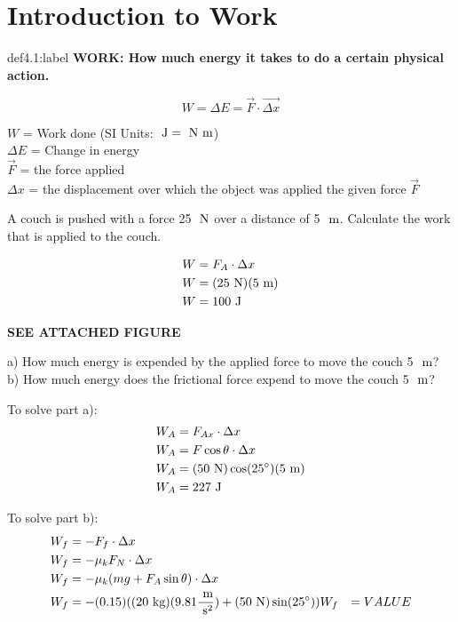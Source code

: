 \section{Introduction to Work}

\begin{definition}{def4.1:label}
    \textbf{WORK: How much energy it takes to do a certain physical action.}

    $$
    W = \Delta E = \vec F \cdot \vec {\Delta x}
    $$

    $W$ = Work done (SI Units: $\text{ J} = \text{ N}\text{ m}$)\\
    $\Delta E$ = Change in energy\\
    $\vec F$ = the force applied\\
    $\Delta x$ = the displacement over which the object was applied the given force $\vec F$
\end{definition}


\begin{problem}
    A couch is pushed with a force 25 $\text{ N}$ over a distance of 5 $\text{ m}$. Calculate the work that is applied to the couch. 

    $$
    \begin{aligned}
        W &= F_A \cdot \Delta x\\
        W &= (25 \text{ N})(5 \text{ m})\\
        W &= 100 \text{ J}
    \end{aligned}
    $$
\end{problem}


\begin{problem}
    \textbf{SEE ATTACHED FIGURE}

    a) How much energy is expended by the applied force to move the couch 5 $\text{ m}$?
    b) How much energy does the frictional force expend to move the couch 5 $\text{ m}$?

    To solve part a):
    $$
    \begin{aligned}
        W_A &= F_{Ax} \cdot \Delta x\\
        W_A &= F\cos\theta \cdot \Delta x\\
        W_A &= (50 \text{ N})\cos(25^\circ)(5 \text{ m})\\
        W_A &= 227 \text{ J}
    \end{aligned}
    $$

    To solve part b):
    $$
    \begin{aligned}
        W_f &= -F_f \cdot \Delta x\\
        W_f &= -\mu_kF_N \cdot \Delta x\\
        W_f &= -\mu_k(mg + F_A\sin\theta) \cdot \Delta x\\
        W_f &= -(0.15)((20\text{ kg})(9.81\frac{\text{ m}}{\text{ s}^2}) + (50\text{ N})\sin(25^\circ))
        W_f &= VALUE
    \end{aligned}
    $$
\end{problem}


